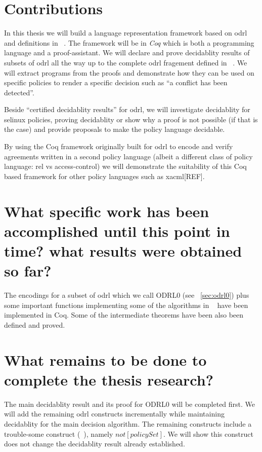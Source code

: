 \section{Contributions}

In this thesis we will build a language representation framework based on \ac{odrl} and definitions in ~\cite{pucella2006}. The framework will be in \emph{Coq} which is both a programming language and a proof-assistant. We will declare and prove decidablity results of subsets of \ac{odrl} all the way up to the complete \ac{odrl} fragement defined in ~\cite{pucella2006}. We will extract programs from the proofs and demonstrate how they can be used on specific policies to render a specific decision such as ``a conflict has been detected''. 

Beside ``certified decidablity results'' for \ac{odrl}, we will investigate decidablity for \ac{selinux} policies, proving decidablity or show why a proof is not possible (if that is the case) and provide proposals to make the policy language decidable.

By using the Coq framework originally built for \ac{odrl} to encode and verify agreements written in a second policy language (albeit a different class of policy language: \ac{rel} vs access-control) we will demonstrate the suitability of this Coq based framework for other policy languages such as \ac{xacml}[REF].

\section{What specific work has been accomplished until this point in time? what results were obtained so far?}

The encodings for a subset of \ac{odrl} which we call ODRL0 (see ~\ref{sec:odrl0}) plus some important functions implementing some of the algorithms in ~\cite{pucella2006} have been implemented in Coq. Some of the intermediate theorems have been also been defined and proved.

\section{What remains to be done to complete the thesis research?}
The main decidablity result and its proof for ODRL0 will be completed first. We will add the remaining \ac{odrl} constructs incrementally while maintaining decidablity for the main decision algorithm. The remaining constructs include a trouble-some construct (~\cite{pucella2006}), namely $not[policySet]$. We will show this construct does not change the decidablity result already established. 

